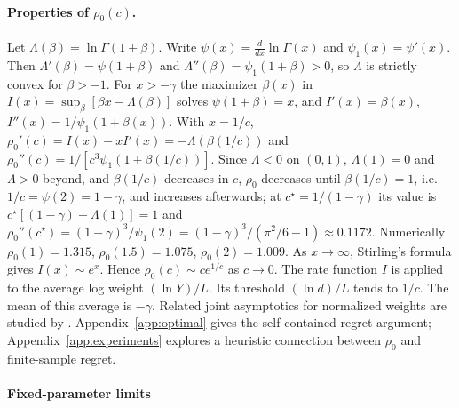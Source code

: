 \documentclass[anon]{alt2027}
\newcommand{\rate}{I}
\newcommand{\cstar}{c^{\star}}
\begin{document}
\paragraph{Properties of $\rho_0(c)$.} Let $\Lambda(\beta)=\ln\Gamma(1+\beta)$. Write $\psi(x)=\frac{d}{dx}\ln\Gamma(x)$ and $\psi_1(x)=\psi'(x)$. Then $\Lambda'(\beta)=\psi(1+\beta)$ and $\Lambda''(\beta)=\psi_1(1+\beta)>0$, so $\Lambda$ is strictly convex for $\beta>-1$. For $x>-\gamma$ the maximizer $\beta(x)$ in $\rate(x)=\sup_\beta[\beta x-\Lambda(\beta)]$ solves $\psi(1+\beta)=x$, and $\rate'(x)=\beta(x)$, $\rate''(x)=1/\psi_1(1+\beta(x))$. With $x=1/c$, $\rho_0'(c)=\rate(x)-x\rate'(x)=-\Lambda(\beta(1/c))$ and $\rho_0''(c)=1/[c^3\psi_1(1+\beta(1/c))]$. Since $\Lambda<0$ on $(0,1)$, $\Lambda(1)=0$ and $\Lambda>0$ beyond, and $\beta(1/c)$ decreases in $c$, $\rho_0$ decreases until $\beta(1/c)=1$, i.e.\ $1/c=\psi(2)=1-\gamma$, and increases afterwards; at $\cstar=1/(1-\gamma)$ its value is $\cstar[(1-\gamma)-\Lambda(1)]=1$ and $\rho_0''(\cstar)=(1-\gamma)^3/\psi_1(2)=(1-\gamma)^3/(\pi^2/6-1)\approx0.1172$. Numerically $\rho_0(1)=1.315$, $\rho_0(1.5)=1.075$, $\rho_0(2)=1.009$. As $x\to\infty$, Stirling's formula gives $\rate(x)\sim e^x$. Hence $\rho_0(c)\sim c e^{1/c}$ as $c\to0$. The rate function $\rate$ is applied to the average log weight $(\ln Y)/L$. Its threshold $(\ln d)/L$ tends to $1/c$. The mean of this average is $-\gamma$. Related joint asymptotics for normalized weights are studied by \citet{jeong2026phase}. Appendix~\ref{app:optimal} gives the self-contained regret argument; Appendix~\ref{app:experiments} explores a heuristic connection between $\rho_0$ and finite-sample regret.

\paragraph{Fixed-parameter limits}
\end{document}

